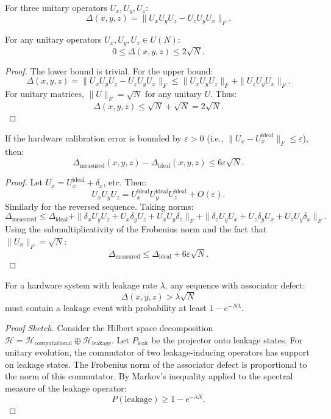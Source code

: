 \documentclass[11pt]{article}
\begin{document}
\begin{enumerate}
\begin{definition}
For three unitary operators $U_x, U_y, U_z$:
\[
\Delta(x, y, z) = \| U_x U_y U_z - U_z U_y U_x \|_F.
\]
\end{definition}

\begin{theorem}
For any unitary operators $U_x, U_y, U_z \in U(N)$:
\[
0 \le \Delta(x, y, z) \le 2\sqrt{N}.
\]
\end{theorem}

\begin{proof}
The lower bound is trivial. For the upper bound:
\[
\Delta(x, y, z) = \| U_x U_y U_z - U_z U_y U_x \|_F \le \| U_x U_y U_z \|_F + \| U_z U_y U_x \|_F.
\]
For unitary matrices, $\| U \|_F = \sqrt{N}$ for any unitary $U$. Thus:
\[
\Delta(x, y, z) \le \sqrt{N} + \sqrt{N} = 2\sqrt{N}.
\]
\end{proof}

\begin{theorem}
If the hardware calibration error is bounded by $\varepsilon > 0$ (i.e., $\| U_x - U_x^{\text{ideal}} \|_F \le \varepsilon$), then:
\[
\Delta_{\text{measured}}(x, y, z) - \Delta_{\text{ideal}}(x, y, z) \le 6\varepsilon \sqrt{N}.
\]
\end{theorem}

\begin{proof}
Let $U_x = U_x^{\text{ideal}} + \delta_x$, etc. Then:
\[
U_x U_y U_z = U_x^{\text{ideal}} U_y^{\text{ideal}} U_z^{\text{ideal}} + O(\varepsilon).
\]
Similarly for the reversed sequence. Taking norms:
\[
\Delta_{\text{measured}} \le \Delta_{\text{ideal}} + \| \delta_x U_y U_z + U_x \delta_y U_z + U_x U_y \delta_z \|_F + \| \delta_z U_y U_x + U_z \delta_y U_x + U_z U_y \delta_x \|_F.
\]
Using the submultiplicativity of the Frobenius norm and the fact that $\| U_x \|_F = \sqrt{N}$:
\[
\Delta_{\text{measured}} \le \Delta_{\text{ideal}} + 6\varepsilon \sqrt{N}.
\]
\end{proof}

\begin{theorem}
For a hardware system with leakage rate $\lambda$, any sequence with associator defect:
\[
\Delta(x, y, z) > \lambda \sqrt{N}
\]
must contain a leakage event with probability at least $1 - e^{-N\lambda}$.
\end{theorem}

\begin{proof}[Proof Sketch]
Consider the Hilbert space decomposition $\mathcal{H} = \mathcal{H}_{\text{computational}} \oplus \mathcal{H}_{\text{leakage}}$. Let $P_{\text{leak}}$ be the projector onto leakage states. For unitary evolution, the commutator of two leakage-inducing operators has support on leakage states. The Frobenius norm of the associator defect is proportional to the norm of this commutator. By Markov's inequality applied to the spectral measure of the leakage operator:
\[
P(\text{leakage}) \ge 1 - e^{-\lambda N}.
\]
\end{proof}


\end{enumerate}
\end{document}
